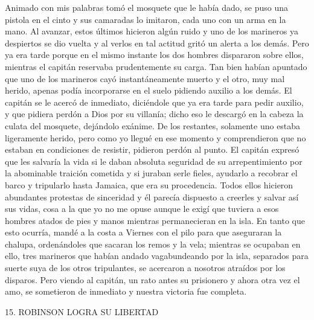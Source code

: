 \documentclass{novela}
\begin{document}
    Animado con mis palabras tomó el mosquete que le había dado, se puso una pistola en el cinto y sus camaradas lo imitaron, cada uno con un arma en la mano. Al avanzar, estos últimos hicieron algún ruido y uno de los marineros ya despiertos se dio vuelta y al verlos en tal actitud gritó un alerta a los demás. Pero ya era tarde porque en el mismo instante los dos hombres dispararon sobre ellos, mientras el capitán reservaba prudentemente su carga. Tan bien habían apuntado que uno de los marineros cayó instantáneamente muerto y el otro, muy mal herido, apenas podía incorporarse en el suelo pidiendo auxilio a los demás. El capitán se le acercó de inmediato, diciéndole que ya era tarde para pedir auxilio, y que pidiera perdón a Dios por su villanía; dicho eso le descargó en la cabeza la culata del mosquete, dejándolo exánime. De los restantes, solamente uno estaba ligeramente herido, pero como yo llegué en ese momento y comprendieron que no estaban en condiciones de resistir, pidieron perdón al punto. El capitán expresó que les salvaría la vida si le daban absoluta seguridad de su arrepentimiento por la abominable traición cometida y si juraban serle fieles, ayudarlo a recobrar el barco y tripularlo hasta Jamaica, que era su procedencia. Todos ellos hicieron abundantes protestas de sinceridad y él parecía dispuesto a creerles y salvar así sus vidas, cosa a la que yo no me opuse aunque le exigí que tuviera a esos hombres atados de pies y manos mientras permanecieran en la isla.
    En tanto que esto ocurría, mandé a la costa a Viernes con el pilo para que aseguraran la chalupa, ordenándoles que sacaran los remos y la vela; mientras se ocupaban en ello, tres marineros que habían andado vagabundeando por la isla, separados para suerte suya de los otros tripulantes, se acercaron a nosotros atraídos por los disparos. Pero viendo al capitán, un rato antes su prisionero y ahora otra vez el amo, se sometieron de inmediato y nuestra victoria fue completa.





    15. ROBINSON LOGRA SU LIBERTAD
\end{document}
